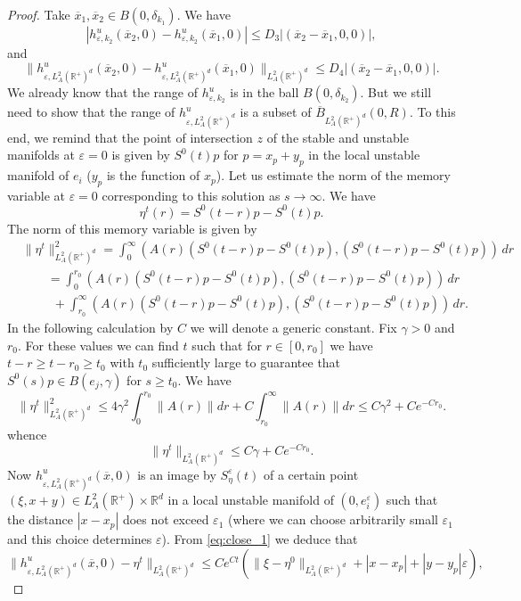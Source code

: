 \documentclass[11pt, leqno]{amsart}
\theoremstyle{definition}
\def\R{\mathbb{R}}
\begin{document}
\begin{proof}
	Take $\overline{x}_1, \overline{x}_2 \in B(0,\delta_{k_1})$. We have
	$$
	|h^u_{\varepsilon,k_2}(\overline{x}_2,0) - h^u_{\varepsilon,k_2}(\overline{x}_1,0)|\leq D_3 |(\overline{x}_2-\overline{x}_1,0,0)|,
	$$
	and
	  $$
	\|h^u_{\varepsilon,L^2_A(\R^+)^d}(\overline{x}_2,0) - h^u_{\varepsilon,L^2_A(\R^+)^d}(\overline{x}_1,0)\|_{L^2_A( \R^+)^d}\leq D_4 |(\overline{x}_2-\overline{x}_1,0,0)|.
	$$
	We already know that the range of $h^u_{\varepsilon,k_2}$ is in the ball $B(0,\delta_{k_2})$. But we still need to show that the range of $h^u_{\varepsilon,L^2_A(\R^+)^d}$ is a subset of $\overline{B}_{L^2_A(\R^+)^d}(0,R)$. To this end, we remind that the point of intersection $z$ of the stable and unstable manifolds at $\varepsilon=0$ is given by $S^0(t)p$ for $p=x_p+y_p$ in the local unstable manifold of $e_i$ ($y_p$ is the function of $x_p$). Let us estimate the norm of the memory variable at $\varepsilon=0$ corresponding to this solution as $s\to \infty$. We have
	$$
	\eta^t(r) = S^0(t-r)p-S^0(t)p.
	$$
	The norm of this memory variable is given by
	\begin{align*}
	& \|\eta^t\|_{L^2_A( \R^+)^d}^2 = \int_0^\infty (A(r)(S^0(t-r)p-S^0(t)p),(S^0(t-r)p-S^0(t)p))\, dr \\
	& \qquad = \int_0^{r_0} (A(r)(S^0(t-r)p-S^0(t)p),(S^0(t-r)p-S^0(t)p))\, dr \\
	& \qquad \ \ + \int_{r_0}^\infty (A(r)(S^0(t-r)p-S^0(t)p),(S^0(t-r)p-S^0(t)p))\, dr.
	\end{align*}
	In the following calculation by $C$ we will denote a generic constant. Fix $\gamma>0$ and   $r_0$. For these values we can find $t$ such that for $r\in [0,r_0]$ we have $t-r \geq t-r_0 \geq t_0$ with $t_0$ sufficiently large to guarantee that $S^0(s)p \in B(e_j,\gamma)$ for $s\geq t_0$. We have
	$$
	\|\eta^t\|_{L^2_A( \R^+)^d}^2 \leq 4\gamma^2\int_0^{r_0}\|A(r)\|dr + C\int_{r_0}^\infty\|A(r)\|dr \leq C\gamma^2 + Ce^{-Cr_0}.
	$$
	whence
	$$
	\|\eta^t\|_{L^2_A( \R^+)^d} \leq C\gamma + Ce^{-Cr_0}.
	$$
	Now $h^u_{\varepsilon,L^2_A(\R^+)^d}(\overline{x},0) $ is an image by $S^\varepsilon_\eta(t)$ of a certain point $(\xi,x+y)\in L^2_A(\R^+)\times \R^d$ in a local unstable manifold of $(0,e^\varepsilon_i)$ such that the distance $|x-x_p|$ does not exceed $\varepsilon_1$ (where we can choose arbitrarily small $\varepsilon_1$ and this choice determines $\varepsilon$).
	From \eqref{eq:close_1} we deduce that
	$$
	\|h^u_{\varepsilon,L^2_A(\R^+)^d}(\overline{x},0) - \eta^t\|_{L^2_A( \R^+)^d} \leq Ce^{Ct}(\|\xi-\eta^0\|_{L^2_A( \R^+)^d} + |x-x_p| + |y-y_p| \varepsilon),
$$
\end{proof}
\end{document}
